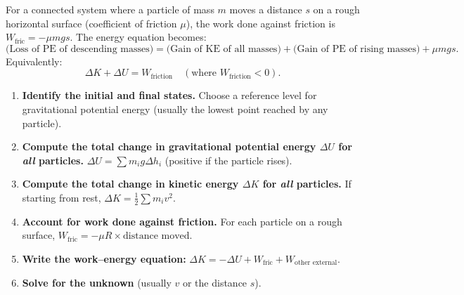 \documentclass[11pt]{article}
\begin{document}
\begin{propriete}
For a connected system where a particle of mass $m$ moves a distance $s$ on a rough horizontal surface (coefficient of friction $\mu$), the work done against friction is $W_{\text{fric}} = -\mu mg s$.  The energy equation becomes:
\[
\text{(Loss of PE of descending masses)} = \text{(Gain of KE of all masses)} + \text{(Gain of PE of rising masses)} + \mu mg s.
\]
Equivalently:
\[
\Delta K + \Delta U = W_{\text{friction}} \quad (\text{where } W_{\text{friction}} < 0).
\]
\end{propriete}

\begin{methode}
\begin{enumerate}
\item \textbf{Identify the initial and final states.}  Choose a reference level for gravitational potential energy (usually the lowest point reached by any particle).
\item \textbf{Compute the total change in gravitational potential energy $\Delta U$ for \emph{all} particles.}  $\Delta U = \sum m_i g \Delta h_i$ (positive if the particle rises).
\item \textbf{Compute the total change in kinetic energy $\Delta K$ for \emph{all} particles.}  If starting from rest, $\Delta K = \frac{1}{2}\sum m_i v^2$.
\item \textbf{Account for work done against friction.}  For each particle on a rough surface, $W_{\text{fric}} = -\mu R \times \text{distance moved}$.
\item \textbf{Write the work–energy equation:} $\Delta K = -\Delta U + W_{\text{fric}} + W_{\text{other external}}$.
\item \textbf{Solve for the unknown} (usually $v$ or the distance $s$).
\end{enumerate}
\end{methode}
\end{document}
